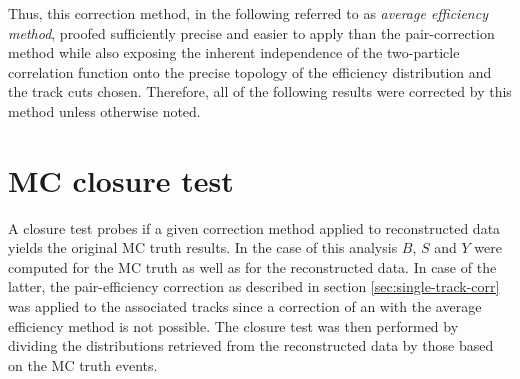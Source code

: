Thus, this correction method, in the following referred to as \emph{average efficiency method}, proofed sufficiently precise and easier to apply than the pair-correction method while also exposing the inherent independence of the two-particle correlation function onto the precise topology of the efficiency distribution and the track cuts chosen. Therefore, all of the following results were corrected by this method unless otherwise noted.


\section{MC closure test}
\label{sec:mc-closure}
A closure test probes if a given correction method applied to reconstructed data yields the original MC truth results. In the case of this analysis $B$, $S$ and $Y$ were computed for the MC truth as well as for the reconstructed data. In case of the latter, the pair-efficiency correction as described in section \ref{sec:single-track-corr} was applied to the associated tracks since a correction of \Sig an \B with the average efficiency method is not possible. The closure test was then performed by dividing the distributions retrieved from the reconstructed data by those based on the MC truth events.

